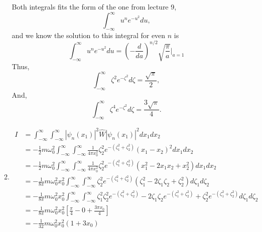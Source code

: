 \documentclass[10pt]{article}
\begin{document}
\begin{enumerate}
\begin{enumerate}
    Both integrals fits the form of the one from lecture 9, 
    \[
      \int_{-\infty}^{\infty} u^{n} e ^ {-u^2}du
    ,\]
    and we know the solution to this integral for even $ n $ is 
    \[
      \int_{-\infty}^{\infty} u^{n} e ^ {-u^2}du = \left( - \frac{d}{da} \right) ^{n / 2} \sqrt{\frac{\pi}{a}} \Bigg|_{a=1}
    \]
    Thus,
    \begin{equation*}
      \int_{-\infty}^{\infty} \zeta ^2 e ^ {-\zeta^2}d \zeta = \frac{\sqrt{\pi}}{2}
    ,\end{equation*}
    And,
    \begin{equation*}
      \int_{-\infty}^{\infty} \zeta ^4 e ^ {-\zeta^2}d \zeta = \frac{3\sqrt{\pi}}{4}
    .\end{equation*}
  \item 
    \begin{align*}
      I &= \int_{-\infty}^{\infty} \int_{-\infty}^{\infty} \left| \psi_n \left( x_1 \right) \right|^2 \hat{W} \left| \psi_n \left( x_1 \right) \right| ^2 d x_1 d x_2  \\
      &= -\frac{1}{2} m \omega_0 ^2 \int_{-\infty}^{\infty} \int_{-\infty}^{\infty} \frac{1}{4\pi x_0^2} \zeta_2^2 e ^ {- \left( \zeta_1^2+\zeta_2^2 \right)} \left( x_1-x_2 \right) ^2 d x_1 d x_2 \\
      &= -\frac{1}{2} m \omega_0 ^2 \int_{-\infty}^{\infty} \int_{-\infty}^{\infty} \frac{1}{4\pi x_0^2} \zeta_2^2 e ^ {- \left( \zeta_1^2+\zeta_2^2 \right)} \left( x_1^2-2x_1x_2+x_2^2 \right) d x_1 d x_2 \\
      &= -\frac{1}{8\pi} m \omega_0 ^2 x_0^2 \int_{-\infty}^{\infty} \int_{-\infty}^{\infty}  \zeta_2^2 e ^ {- \left( \zeta_1^2+\zeta_2^2 \right)} \left( \zeta_1^2-2\zeta_1\zeta_2+\zeta_2^2 \right) d \zeta_1 d \zeta_2 \\
      &= -\frac{1}{8\pi} m \omega_0 ^2 x_0 ^2 \int_{-\infty}^{\infty} \int_{-\infty}^{\infty}  \zeta_1^2 \zeta_2^2 e ^ {- \left( \zeta_1^2+\zeta_2^2 \right)}-2\zeta_1\zeta_2 e ^ {- \left( \zeta_1^2+\zeta_2^2 \right)}+\zeta_2^2e ^ {- \left( \zeta_1^2 +\zeta_2^2 \right)}  d \zeta_1 d \zeta_2 \\
      &= -\frac{1}{8\pi} m \omega_0 ^2 x_0^2 \left[ \frac{\pi}{4} - 0 +  \frac{3\pi x_0}{4} \right] \\
      &= -\frac{1}{32} m \omega_0 ^2 x_0^2 \left( 1 + 3 x_0 \right)
    \end{align*}


\end{enumerate}
\end{enumerate}
\end{document}
